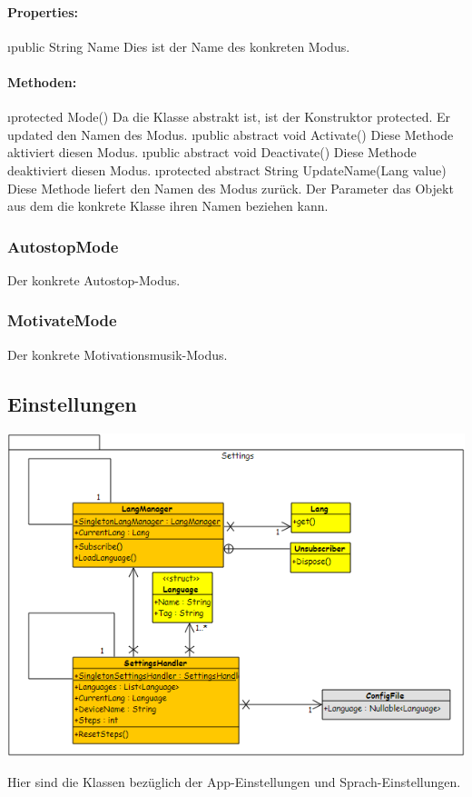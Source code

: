 \documentclass[../entwurf.tex]{subfiles}
\begin{document}
				\paragraph{Properties:}
					\begin{itemize}
						\i{public String Name} Dies ist der Name des konkreten Modus.
					\end{itemize}
				\paragraph{Methoden:}
					\begin{itemize}
						\i{protected Mode()} Da die Klasse abstrakt ist, ist der Konstruktor protected. Er updated den Namen des Modus.
						\i{public abstract void Activate()} Diese Methode aktiviert diesen Modus.
						\i{public abstract void Deactivate()} Diese Methode deaktiviert diesen Modus.
						\i{protected abstract String UpdateName(Lang value)}  Diese Methode liefert den Namen des Modus zurück. Der Parameter das
						Objekt aus dem die konkrete Klasse ihren Namen beziehen kann.
					\end{itemize}
			\subsubsection{AutostopMode}
				Der konkrete Autostop-Modus.
			\subsubsection{MotivateMode}
				Der konkrete Motivationsmusik-Modus.
		\subsection{Einstellungen}
			\begin{minipage}{0.6\textwidth}
				\includegraphics[width=\textwidth,height=\textheight,keepaspectratio]{../graphics/uml_diagramme/Settings.png}
			\end{minipage}
			\begin{minipage}{0.4\textwidth}
				Hier sind die Klassen bezüglich der App-Einstellungen und Sprach-Einstellungen.
			\end{minipage}
\end{document}
